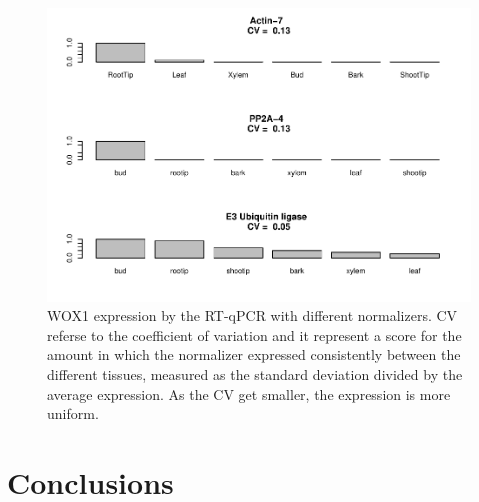 \documentclass[
]{article}
\begin{document}
\begin{figure}[H]

{\centering \includegraphics[width=1\linewidth]{Developing-noval-methods-for-gene-editing-in-trees_files/figure-latex/qPCR-1} 

}

\caption{WOX1 expression by the RT-qPCR with different normalizers. CV referse to the coefficient of variation and it represent a score for the amount in which the normalizer expressed consistently between the different tissues, measured as the standard deviation divided by the average expression. As the CV get smaller, the expression is more uniform.}\label{fig:qPCR}
\end{figure}

\hypertarget{conclusions}{%
\section{Conclusions}\label{conclusions}}
\end{document}
